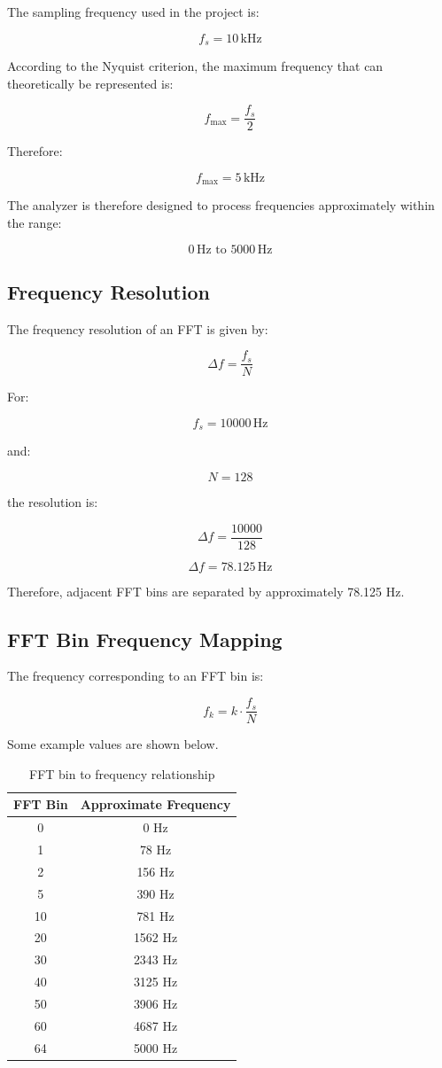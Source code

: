 \documentclass{article}
\begin{document}
\begin{center}
The sampling frequency used in the project is:

\[
f_s = 10\,\text{kHz}
\]

According to the Nyquist criterion, the maximum frequency that can theoretically be represented is:

\[
f_{\text{max}} =
\frac{f_s}{2}
\]

Therefore:

\[
f_{\text{max}} =
5\,\text{kHz}
\]

The analyzer is therefore designed to process frequencies approximately within the range:

\[
0\,\text{Hz}
\text{ to }
5000\,\text{Hz}
\]

\subsection{Frequency Resolution}

The frequency resolution of an FFT is given by:

\[
\Delta f =
\frac{f_s}{N}
\]

For:

\[
f_s = 10000\,\text{Hz}
\]

and:

\[
N = 128
\]

the resolution is:

\[
\Delta f =
\frac{10000}{128}
\]

\[
\boxed{
\Delta f =
78.125\,\text{Hz}
}
\]

Therefore, adjacent FFT bins are separated by approximately 78.125 Hz.

\subsection{FFT Bin Frequency Mapping}

The frequency corresponding to an FFT bin is:

\[
f_k =
k
\cdot
\frac{f_s}{N}
\]

Some example values are shown below.

\begin{table}[H]
\centering
\caption{FFT bin to frequency relationship}
\begin{tabular}{|c|c|}
\hline
\textbf{FFT Bin} & \textbf{Approximate Frequency} \\
\hline
0 & 0 Hz \\
\hline
1 & 78 Hz \\
\hline
2 & 156 Hz \\
\hline
5 & 390 Hz \\
\hline
10 & 781 Hz \\
\hline
20 & 1562 Hz \\
\hline
30 & 2343 Hz \\
\hline
40 & 3125 Hz \\
\hline
50 & 3906 Hz \\
\hline
60 & 4687 Hz \\
\hline
64 & 5000 Hz \\
\hline
\end{tabular}
\end{table}


\end{center}
\end{document}

